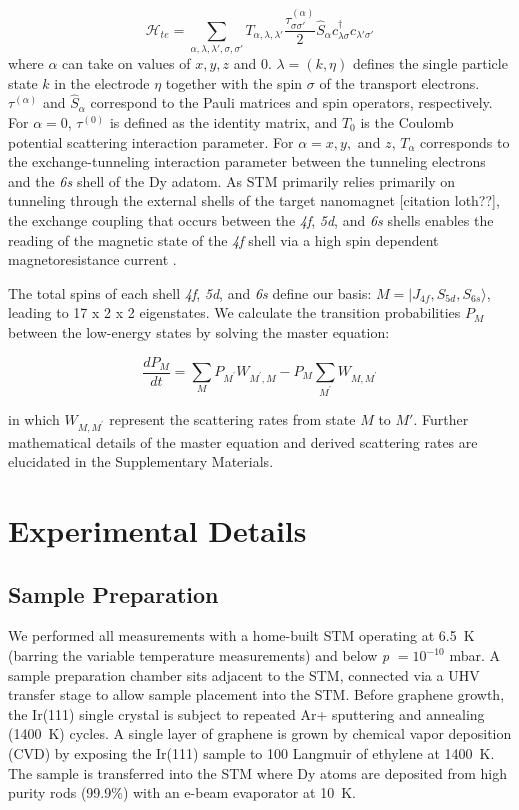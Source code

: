 \documentclass[
reprint,amsmath,amssymb,aps]{revtex4-2}
\begin{document}
\begin{equation}
\mathcal{H}_{te} = \sum_{\alpha,\lambda, \lambda',\sigma,\sigma'} T_{\alpha,\lambda, \lambda'} \frac{\tau^{(\alpha)}_{\sigma\sigma'}}{2} \hat{S}_{\alpha} c^{\dagger}_{\lambda\sigma} c_{\lambda'\sigma'}
\end{equation}
where $\alpha$ can take on values of $x, y, z$ and $0$. $\lambda = (k,\eta)$ defines the single particle state $k$ in the electrode $\eta$ together with the spin $\sigma$ of the transport electrons. $\tau^{(\alpha)}$ and $\hat{S}_{\alpha}$ correspond to the Pauli matrices and spin operators, respectively. For $\alpha = 0$, $\tau^{(0)}$ is defined as the identity matrix, and $T_{0}$ is the Coulomb potential scattering interaction parameter. For $\alpha = x, y,$ and $z$, $T_{\alpha}$ corresponds to the exchange-tunneling interaction parameter between the tunneling electrons and the \textit{6s} shell of the Dy adatom. As STM primarily relies primarily on tunneling through the external shells of the target nanomagnet [citation loth??], the exchange coupling that occurs between the \textit{4f}, \textit{5d}, and \textit{6s} shells enables the reading of the magnetic state of the \textit{4f} shell via a high spin dependent magnetoresistance current \citep{pivetta2020}.\par
The total spins of each shell \textit{4f}, \textit{5d}, and \textit{6s} define our basis: $M=|J_{4f}, S_{5d}, S_{6s} \rangle$, leading to 17 x 2 x 2 eigenstates. We calculate the transition probabilities $P_M$ between the low-energy states by solving the master equation:

\begin{equation}
\dfrac{dP_M}{dt}=\sum_M P_{M^{\prime}}W_{M^{\prime},M} - P_M\sum_{M^{\prime}}W_{M,M^{\prime}}
\end{equation}

in which $W_{M,M^{\prime}}$ represent the scattering rates from state $M$ to $M'$. Further mathematical details of the master equation and derived scattering rates are elucidated in the Supplementary Materials.   
\section{Experimental Details}
\subsection{Sample Preparation}
We performed all measurements with a home-built STM \citep{Gaisch1992} operating at 6.5~K (barring the variable temperature measurements) and below \textit{p} $= 10^{-10}$ mbar. A sample preparation chamber sits adjacent to the STM, connected via a UHV transfer stage to allow sample placement into the STM. Before graphene growth, the Ir(111) single crystal is subject to repeated Ar+ sputtering and annealing (1400~K) cycles. A single layer of graphene is grown by chemical vapor deposition (CVD) by exposing the Ir(111) sample to 100 Langmuir of ethylene at 1400~K. The sample is transferred into the STM where Dy atoms are deposited from high purity rods (99.9\%) with an e-beam evaporator at 10~K.
\end{document}
